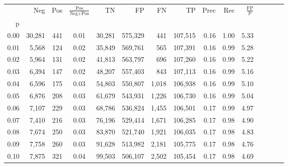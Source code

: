 \begin{tabular}{rrrcrrrrrrrrrrr}
\toprule
{} &     Neg &    Pos & $\frac{\text{Pos}}{\text{Neg}+\text{Pos}}$ &       TN &       FP &       FN &       TP &  Prec &   Rec & $\frac{\text{FP}}{\text{P}}$ \\
p    &         &        &                                            &          &          &          &          &       &       &                              \\
\midrule
0.00 &  30,281 &    441 &                                       0.01 &   30,281 &  575,329 &      441 &  107,515 &  0.16 &  1.00 &                         5.33 \\
0.01 &   5,568 &    124 &                                       0.02 &   35,849 &  569,761 &      565 &  107,391 &  0.16 &  0.99 &                         5.28 \\
0.02 &   5,964 &    131 &                                       0.02 &   41,813 &  563,797 &      696 &  107,260 &  0.16 &  0.99 &                         5.22 \\
0.03 &   6,394 &    147 &                                       0.02 &   48,207 &  557,403 &      843 &  107,113 &  0.16 &  0.99 &                         5.16 \\
0.04 &   6,596 &    175 &                                       0.03 &   54,803 &  550,807 &    1,018 &  106,938 &  0.16 &  0.99 &                         5.10 \\
0.05 &   6,876 &    208 &                                       0.03 &   61,679 &  543,931 &    1,226 &  106,730 &  0.16 &  0.99 &                         5.04 \\
0.06 &   7,107 &    229 &                                       0.03 &   68,786 &  536,824 &    1,455 &  106,501 &  0.17 &  0.99 &                         4.97 \\
0.07 &   7,410 &    216 &                                       0.03 &   76,196 &  529,414 &    1,671 &  106,285 &  0.17 &  0.98 &                         4.90 \\
0.08 &   7,674 &    250 &                                       0.03 &   83,870 &  521,740 &    1,921 &  106,035 &  0.17 &  0.98 &                         4.83 \\
0.09 &   7,758 &    260 &                                       0.03 &   91,628 &  513,982 &    2,181 &  105,775 &  0.17 &  0.98 &                         4.76 \\
0.10 &   7,875 &    321 &                                       0.04 &   99,503 &  506,107 &    2,502 &  105,454 &  0.17 &  0.98 &                         4.69 \\

\end{tabular}
